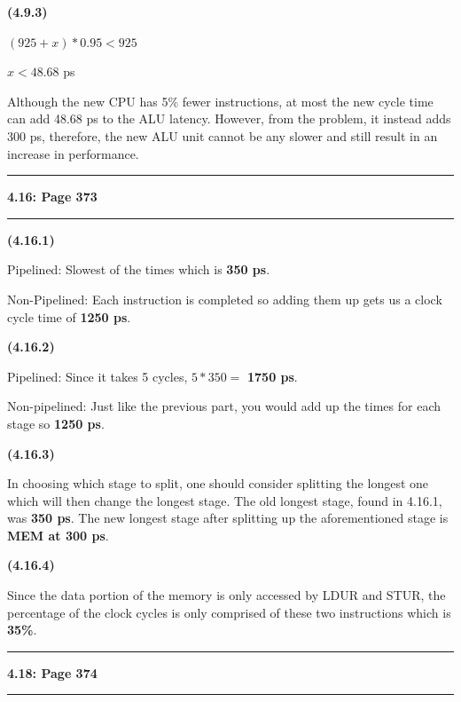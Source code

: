 \documentclass[11pt]{article}
\newcommand\question[2]{\vspace{.25in}\hrule\textbf{#1: #2}\vspace{.5em}\hrule\vspace{.10in}}
\renewcommand\part[1]{\vspace{.10in}\textbf{(#1)}\par}
\begin{document}
	\part{4.9.3}
		$(925+x) * 0.95 < 925$\par
		$x < 48.68$ ps\par
		Although the new CPU has 5\% fewer instructions, at most the new cycle time can add 48.68 ps to the ALU latency. However, from the problem, it instead adds 300 ps, therefore, the new ALU unit cannot be any slower and still result in an increase in performance.\par
	
	
\question{4.16}{Page 373}
	\part{4.16.1}
		Pipelined: Slowest of the times which is \textbf{350 ps}.\par
		Non-Pipelined: Each instruction is completed so adding them up gets us a clock cycle time of \textbf{1250 ps}.\par
	
	\part{4.16.2}
		Pipelined: Since it takes 5 cycles, $5*350=$ \textbf{1750 ps}.\par
		Non-pipelined: Just like the previous part, you would add up the times for each stage so \textbf{1250 ps}.\par
		
	\part{4.16.3}
		In choosing which stage to split, one should consider splitting the longest one which will then change the longest stage. The old longest stage, found in 4.16.1, was \textbf{350 ps}. The new longest stage after splitting up the aforementioned stage is \textbf{MEM at 300 ps}.\par
		
	\part{4.16.4}
		Since the data portion of the memory is only accessed by LDUR and STUR, the percentage of the clock cycles is only comprised of these two instructions which is \textbf{35\%}.
		
	
\question{4.18}{Page 374}
\end{document}
